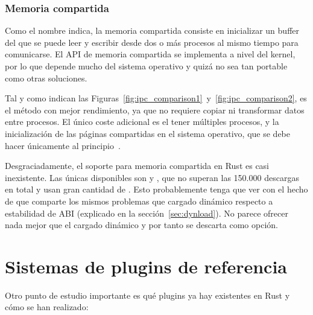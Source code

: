 \subsubsection{Memoria compartida}

Como el nombre indica, la memoria compartida consiste en inicializar un buffer
del que se puede leer y escribir desde dos o más procesos al mismo tiempo para
comunicarse. El API de memoria compartida se implementa a nivel del kernel, por
lo que depende mucho del sistema operativo y quizá no sea tan portable como
otras soluciones.

Tal y como indican las
Figuras~\ref{fig:ipc_comparison1}~y~\ref{fig:ipc_comparison2}, es el método con
mejor rendimiento, ya que no requiere copiar ni transformar datos entre
procesos. El único coste adicional es el tener múltiples procesos, y la
inicialización de las páginas compartidas en el sistema operativo, que se debe
hacer únicamente al principio~\cite{sharedmemperf}.

Desgraciadamente, el soporte para memoria compartida en Rust es casi
inexistente. Las únicas \crates disponibles son  y
, que no superan las 150.000 descargas en total y usan gran
cantidad de \unsafe. Esto probablemente tenga que ver con el hecho de que
comparte los mismos problemas que cargado dinámico respecto a estabilidad de ABI
(explicado en la sección~\ref{sec:dynload}). No parece ofrecer nada mejor que el
cargado dinámico y por tanto se descarta como opción.

\section{Sistemas de plugins de referencia}

Otro punto de estudio importante es qué plugins ya hay existentes en Rust y cómo
se han realizado:

